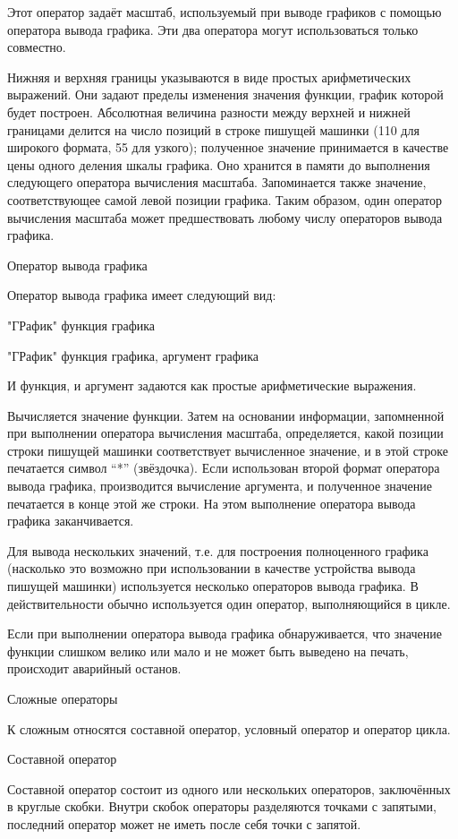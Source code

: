 \documentclass[11pt]{article}
\begin{document}
Этот оператор задаёт масштаб,
используемый при выводе графиков с
помощью оператора вывода графика. Эти
два оператора могут использоваться
только совместно.

Нижняя и верхняя границы указываются в
виде простых арифметических выражений.
Они задают пределы изменения значения
функции, график которой будет построен.
Абсолютная величина разности между
верхней и нижней границами делится на
число позиций в строке пишущей машинки
(110 для широкого формата, 55 для узкого);
полученное значение принимается в
качестве цены одного деления шкалы
графика. Оно хранится в памяти до
выполнения следующего оператора
вычисления масштаба. Запоминается
также значение, соответствующее самой
левой позиции графика. Таким образом,
один оператор вычисления масштаба
может предшествовать любому числу
операторов вывода графика.

Оператор вывода графика

Оператор вывода графика имеет
следующий вид:

"ГРафик" функция графика

"ГРафик" функция графика, аргумент
графика

И функция, и аргумент задаются как
простые арифметические выражения.

Вычисляется значение функции. Затем на
основании информации, запомненной при
выполнении оператора вычисления
масштаба, определяется, какой позиции
строки пишущей машинки соответствует
вычисленное значение, и в этой строке
печатается символ “*” (звёздочка). Если
использован второй формат оператора
вывода графика, производится
вычисление аргумента, и полученное
значение печатается в конце этой же
строки. На этом выполнение оператора
вывода графика заканчивается.

Для вывода нескольких значений, т.е. для
построения полноценного графика
(насколько это возможно при
использовании в качестве устройства
вывода пишущей машинки) используется
несколько операторов вывода графика. В
действительности обычно используется
один оператор, выполняющийся в цикле.

Если при выполнении оператора вывода
графика обнаруживается, что значение
функции слишком велико или мало и не
может быть выведено на печать,
происходит аварийный останов.

Сложные операторы

К сложным относятся составной
оператор, условный оператор и оператор
цикла.

Составной оператор

Составной оператор состоит из одного
или нескольких операторов, заключённых
в круглые скобки. Внутри скобок
операторы разделяются точками с
запятыми, последний оператор может не
иметь после себя точки с запятой.
\end{document}

